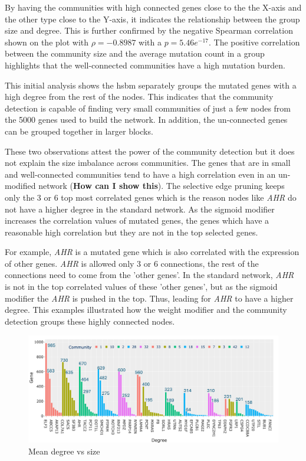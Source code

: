 By having the communities with high connected genes close to the the X-axis and the other type close to the Y-axis, it indicates the relationship between the group size and degree. This is further confirmed by the negative Spearman correlation shown on the plot with $\rho=-0.8987$ with a $p=5.46e^{-17}$. The positive correlation between the community size and the average mutation count in a group highlights that the well-connected communities have a high mutation burden.

This initial analysis shows the \acrfull{hsbm} separately groups the mutated genes with a high degree from the rest of the nodes. This indicates that the community detection is capable of finding very small communities of just a few nodes from the 5000 genes used to build the network. In addition, the un-connected genes can be grouped together in larger blocks. 

These two observations attest the power of the community detection but it does not explain the size imbalance across communities. The genes that are in small and well-connected communities tend to have a high correlation even in an un-modified network (\textbf{How can I show this}). The selective edge pruning keeps only the 3 or 6 top most correlated genes which is the reason nodes like \textit{AHR} do not have a higher degree in the standard network. As the sigmoid modifier increases the correlation values of mutated genes, the genes which have a reasonable high correlation but they are not in the top selected genes. 

For example, \textit{AHR} is a mutated gene which is also correlated with the expression of other genes. \textit{AHR} is allowed only 3 or 6 connections, the rest of the connections need to come from the 'other genes'. In the standard network, \textit{AHR} is not in the top correlated values of these 'other genes', but as the sigmoid modifier the \textit{AHR} is pushed in the top. Thus, leading for \textit{AHR} to have a higher degree. This examples illustrated how the weight modifier and the community detection groups these highly connected nodes.




\begin{figure}[!htb]    
    \centering
    \includegraphics[width=1.0\textwidth,height=1.0\textheight,keepaspectratio]{Sections/Network_II/resources/reward/SmallCom_gene_labeled.png}
    \caption{Mean degree vs size}
    \label{fig:N_II:genes_highConn}
\end{figure}



